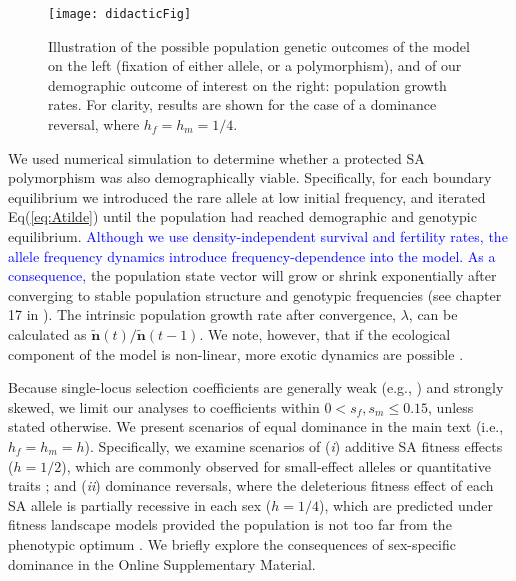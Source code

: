 \documentclass[11pt]{article}
\def\mbf#1{\mathbf{#1}}
\begin{document}
 \begin{figure}[htbp]
 \centering
 \texttt{[image: didacticFig]}
 \caption{\footnotesize{Illustration of the possible population genetic outcomes of the model on the left (fixation of either allele, or a polymorphism), and of our demographic outcome of interest on the right:  population growth rates. For clarity, results are shown for the case of a dominance reversal, where $h_f = h_m = 1/4$.}}
 \label{fig:didactic}
 \end{figure}

We used numerical simulation to determine whether a protected SA polymorphism was also demographically viable. Specifically, for each boundary equilibrium we introduced the rare allele at low initial frequency, and iterated Eq(\ref{eq:Atilde}) until the population had reached demographic and genotypic equilibrium. \textcolor{blue}{Although we use density-independent survival and fertility rates, the allele frequency dynamics introduce frequency-dependence into the model. As a consequence, }the population state vector will grow or shrink exponentially after converging to stable population structure and genotypic frequencies (see chapter 17 in \citealt{Caswell2001}). The intrinsic population growth rate after convergence, $\lambda$, can be calculated as $\tilde{\mbf{n}}(t)/\tilde{\mbf{n}}(t-1)$. We note, however, that if the ecological component of the model is non-linear, more exotic dynamics are possible \citep{de2020matrix}.


Because single-locus selection coefficients are generally weak (e.g., \citealt{Eyre-WalkerKeightly2007}) and strongly skewed, we limit our analyses to coefficients within $0 < s_f,s_m \leq 0.15$, unless stated otherwise. We present scenarios of equal dominance in the main text (i.e., $h_f = h_m = h$). Specifically, we examine scenarios of ({\itshape i}) additive SA fitness effects ($h = 1/2$), which are commonly observed for small-effect alleles or quantitative traits \citep{AgrawalWhitlock2011}; and ({\itshape ii}) dominance reversals, where the deleterious fitness effect of each SA allele is partially recessive in each sex ($h = 1/4$), which are predicted under fitness landscape models provided the population is not too far from the phenotypic optimum \citep{Manna2011, ConnallonClark2014}. We briefly explore the consequences of sex-specific dominance in the Online Supplementary Material.
\end{document}
